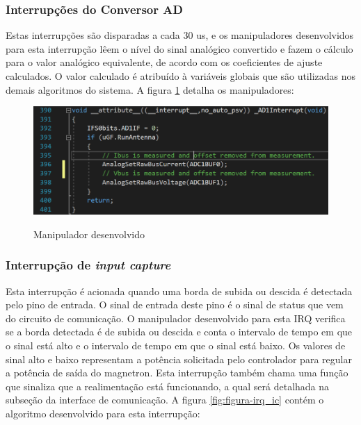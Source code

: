 \subsubsection{Interrupções do Conversor AD}
Estas interrupções são disparadas a cada 30 us, e os manipuladores desenvolvidos para esta interrupção lêem o nível do sinal analógico convertido e fazem o cálculo para o valor analógico equivalente, de acordo com os coeficientes de ajuste calculados. O valor calculado é atribuído à variáveis globais que são utilizadas nos demais algoritmos do sistema. A figura \ref{fig:figura-irq_ad} detalha os manipuladores:

\begin{figure}[H]
    \centering
    \caption{Manipulador desenvolvido}
    \includegraphics[width=1\textwidth]{./dados/figuras/irq_ad}
    \label{fig:figura-irq_ad}
\end{figure}


\subsubsection{Interrupção de \textit{input capture}}
Esta interrupção é acionada quando uma borda de subida ou descida é detectada pelo pino de entrada. O sinal de entrada deste pino é o sinal de status que vem do circuito de comunicação. O manipulador desenvolvido para esta IRQ verifica se a borda detectada é de subida ou descida e conta o intervalo de tempo em que o sinal está alto e o intervalo de tempo em que o sinal está baixo. Os valores de sinal alto e baixo representam a potência solicitada pelo controlador para regular a potência de saída do magnetron. Esta interrupção também chama uma função que sinaliza que a realimentação está funcionando, a qual será detalhada na subseção da interface de comunicação. A figura \ref{fig:figura-irq_ic} contém o algoritmo desenvolvido para esta interrupção:

